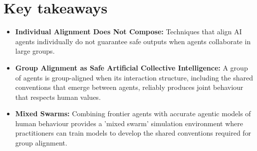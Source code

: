\section*{Key takeaways}
\begin{itemize}
    \item \textbf{Individual Alignment Does Not Compose:} Techniques that align AI agents individually do not guarantee safe outputs when agents collaborate in large groups. 
    \item \textbf{Group Alignment as Safe Artificial Collective Intelligence:} A group of agents is group-aligned when its interaction structure, including the shared conventions that emerge between agents, reliably produces joint behaviour that respects human values.
    \item \textbf{Mixed Swarms:} Combining frontier agents with accurate agentic models of human behaviour provides a 'mixed swarm' simulation environment where practitioners can train models to develop the shared conventions required for group alignment. 
\end{itemize}
